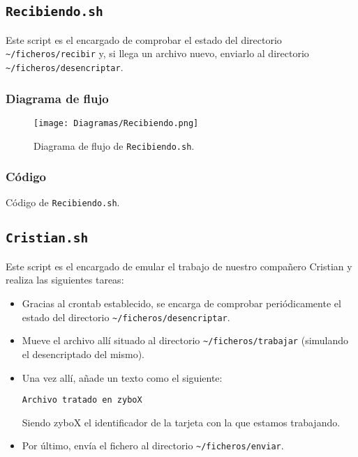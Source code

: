 \documentclass[12pt,letterpaper]{article}
\begin{document}
\subsection{\texttt{Recibiendo.sh}}
Este script es el encargado de comprobar el estado del directorio \texttt{\textasciitilde/ficheros/recibir} y, si llega un archivo nuevo, enviarlo al directorio \texttt{\textasciitilde/ficheros/desencriptar}.

\newpage
\subsubsection{Diagrama de flujo}
\begin{figure}[h]
	\centering
	\texttt{[image: Diagramas/Recibiendo.png]}
	\caption{Diagrama de flujo de \texttt{Recibiendo.sh}.}
	\label{Diagrama de flujo de Recibiendo.sh}
\end{figure}

\subsubsection{Código}

\begin{center}
	Código de \texttt{Recibiendo.sh}.
\end{center}

\subsection{\texttt{Cristian.sh}}
Este script es el encargado de emular el trabajo de nuestro compañero Cristian y realiza las siguientes tareas:
\begin{itemize}
	\item Gracias al crontab establecido, se encarga de comprobar periódicamente el estado del directorio \texttt{\textasciitilde/ficheros/desencriptar}.
	\item Mueve el archivo allí situado al directorio \texttt{\textasciitilde/ficheros/trabajar} (simulando el desencriptado del mismo).
	\item Una vez allí, añade un texto como el siguiente:
	\begin{center}
		\texttt{Archivo tratado en zyboX}
	\end{center}	
	Siendo zyboX el identificador de la tarjeta con la que estamos trabajando.
	\item Por último, envía el fichero al directorio \texttt{\textasciitilde/ficheros/enviar}.
\end{itemize}
\end{document}
